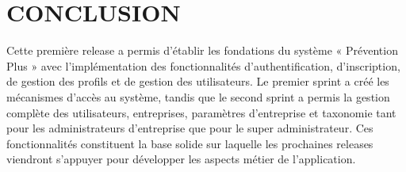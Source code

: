\section*{CONCLUSION}
\noindent Cette première release a permis d'établir les fondations du système « Prévention Plus » avec l'implémentation des fonctionnalités d'authentification, d'inscription, de gestion des profils et de gestion des utilisateurs.
 Le premier sprint a créé les mécanismes d'accès au système, tandis que le second sprint a permis la gestion complète des utilisateurs, entreprises, paramètres d'entreprise et taxonomie tant pour les administrateurs d'entreprise que pour le super administrateur. Ces fonctionnalités constituent la base solide sur laquelle les prochaines releases viendront s'appuyer pour développer les aspects métier de l'application.